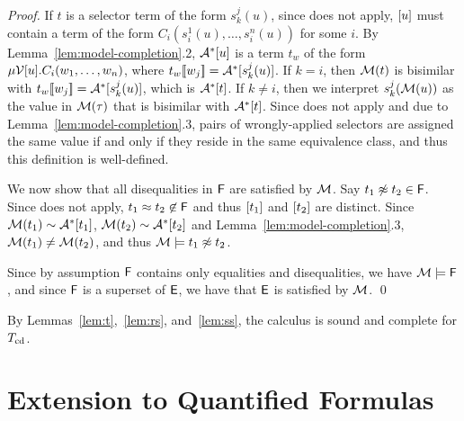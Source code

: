 \begin{proof}
If $t$ is a selector term of the form $s^j_k( u )$,
since  does not apply, 
$[ u ]$ must contain a term of the form $C_i( s^1_i( u ), \ldots, s^{n}_i( u ) )$ for some $i$.
By Lemma~\ref{lem:model-completion}.2, $\mathcal{A}^\ast [ u ]$ is a term $t_w$ of the form
$\mu \mathcal{V}{[ u ]}. C_i( w_1, \ldots, w_n )$,
where $t_w [\![  w_j  ]\!] = \mathcal{A}^\ast [  s^j_k( u ) ]$. 
If $k = i$, then $\mathcal{M}( t )$ is bisimilar with $t_w[\![ w_j ]\!] = \mathcal{A}^\ast [  s^j_k( u ) ]$,
which is $\mathcal{A}^\ast [ t ]$.
If $k \neq i$, then we interpret $s^j_k( \mathcal{M}( u ) )$ as the value in $\mathcal{M}( \tau )$ that is bisimilar with $\mathcal{A}^\ast [  t  ]$.
Since  does not apply and due to Lemma~\ref{lem:model-completion}.3, 
pairs of wrongly-applied selectors are assigned the same value if and only if they reside in the same equivalence class,
and thus this definition is well-defined.

We now show that all disequalities in $\mathsf{F}$ are satisfied by $\mathcal{M}$.
Say $t_1 \not\approx t_2 \in \mathsf{F}$.
Since  does not apply, $t_1 \approx t_2 \not\in \mathsf{F}$ and thus $[ t_1 ]$ and $[ t_2 ]$ are distinct.
Since $\mathcal{M}( t_1 ) \sim \mathcal{A}^\ast [ t_1 ]$, $\mathcal{M}( t_2 ) \sim \mathcal{A}^\ast [ t_2 ]$
and Lemma~\ref{lem:model-completion}.3, $\mathcal{M}( t_1 ) \neq \mathcal{M}( t_2 )$, and thus $\mathcal{M} \models t_1 \not\approx t_2$.

Since by assumption $\mathsf{F}$ contains only equalities and disequalities, we have $\mathcal{M} \models \mathsf{F}$,
and since $\mathsf{F}$ is a superset of $\mathsf{E}$, we have that $\mathsf{E}$ is satisfied by $\mathcal{M}$.
\qed
\end{proof}

By Lemmas~\ref{lem:t},~\ref{lem:rs}, and~\ref{lem:ss}, the calculus is sound and complete for $T_{\mathrm{cd}}$.

\section{Extension to Quantified Formulas}
\label{sec:extension-to-quantified-formulas}

